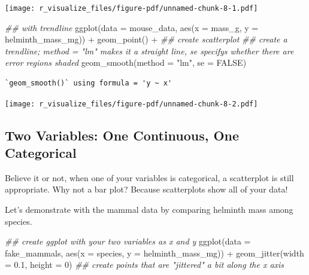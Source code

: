 \documentclass[
  letterpaper,
  DIV=11,
  numbers=noendperiod]{scrreprt}
\newenvironment{Shaded}{\begin{snugshade}}{\end{snugshade}}
\newcommand{\AttributeTok}[1]{\textcolor[rgb]{0.40,0.45,0.13}{#1}}
\newcommand{\ConstantTok}[1]{\textcolor[rgb]{0.56,0.35,0.01}{#1}}
\newcommand{\DecValTok}[1]{\textcolor[rgb]{0.68,0.00,0.00}{#1}}
\newcommand{\DocumentationTok}[1]{\textcolor[rgb]{0.37,0.37,0.37}{\textit{#1}}}
\newcommand{\FloatTok}[1]{\textcolor[rgb]{0.68,0.00,0.00}{#1}}
\newcommand{\FunctionTok}[1]{\textcolor[rgb]{0.28,0.35,0.67}{#1}}
\newcommand{\NormalTok}[1]{\textcolor[rgb]{0.00,0.23,0.31}{#1}}
\newcommand{\SpecialCharTok}[1]{\textcolor[rgb]{0.37,0.37,0.37}{#1}}
\newcommand{\StringTok}[1]{\textcolor[rgb]{0.13,0.47,0.30}{#1}}
\begin{document}
\texttt{[image: r\_visualize\_files/figure-pdf/unnamed-chunk-8-1.pdf]}

\begin{Shaded}
\begin{Highlighting}[]
\DocumentationTok{\#\# with trendline}
\FunctionTok{ggplot}\NormalTok{(}\AttributeTok{data =}\NormalTok{ mouse\_data, }\FunctionTok{aes}\NormalTok{(}\AttributeTok{x =}\NormalTok{ mass\_g, }\AttributeTok{y =}\NormalTok{ helminth\_mass\_mg)) }\SpecialCharTok{+}
  \FunctionTok{geom\_point}\NormalTok{() }\SpecialCharTok{+}  \DocumentationTok{\#\# create scatterplot}
  \DocumentationTok{\#\# create a trendline; method = "lm" makes it a straight line, se specifys whether there are error regions shaded}
  \FunctionTok{geom\_smooth}\NormalTok{(}\AttributeTok{method =} \StringTok{"lm"}\NormalTok{, }\AttributeTok{se =} \ConstantTok{FALSE}\NormalTok{)}
\end{Highlighting}
\end{Shaded}

\begin{verbatim}
`geom_smooth()` using formula = 'y ~ x'
\end{verbatim}

\texttt{[image: r\_visualize\_files/figure-pdf/unnamed-chunk-8-2.pdf]}

\subsection{Two Variables: One Continuous, One
Categorical}\label{two-variables-one-continuous-one-categorical}

Believe it or not, when one of your variables is categorical, a
scatterplot is still appropriate. Why not a bar plot? Because
scatterplots show all of your data!

Let's demonstrate with the mammal data by comparing helminth mass among
species.

\begin{Shaded}
\begin{Highlighting}[]
\DocumentationTok{\#\# create ggplot with your two variables as x and y}
\FunctionTok{ggplot}\NormalTok{(}\AttributeTok{data =}\NormalTok{ fake\_mammals, }\FunctionTok{aes}\NormalTok{(}\AttributeTok{x =}\NormalTok{ species, }\AttributeTok{y =}\NormalTok{ helminth\_mass\_mg)) }\SpecialCharTok{+}
  \FunctionTok{geom\_jitter}\NormalTok{(}\AttributeTok{width =} \FloatTok{0.1}\NormalTok{, }\AttributeTok{height =} \DecValTok{0}\NormalTok{) }\DocumentationTok{\#\# create points that are "jittered" a bit along the x axis}
\end{Highlighting}
\end{Shaded}
\end{document}
